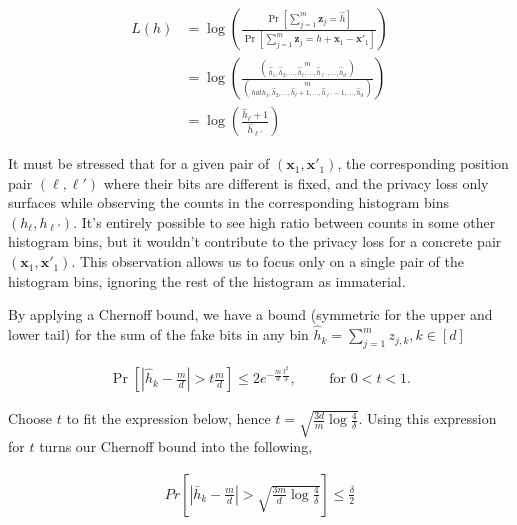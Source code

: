 \documentclass[11pt]{article}
\newcommand{\bbx}{\pmb{x}}
\newcommand{\bbz}{\pmb{z}}
\begin{document}
\begin{align*}
 L(h) &= \log \left ( \frac{\Pr[\sum^m_{j=1} \bbz_j = \hat{h} ]}{\Pr[ \sum^m_{j=1} \bbz_j = \hat{h} + \bbx_1 - \bbx'_1]} \right ) \\
 & = \log  \left ( \frac{ {m \choose \hat{h}_1, \hat{h}_2, \dots , \hat{h}_\ell, \dots, \hat{h}_{\ell'}, \dots, \hat{h}_d}}{ { m \choose hat{h}_1, \hat{h}_2, \dots , \hat{h}_\ell + 1, \dots, \hat{h}_{\ell'} - 1, \dots, \hat{h}_d}} \right ) \\
 & = \log  \left ( \frac{\hat{h}_\ell + 1}{\hat{h}_{\ell'}} \right ) 
\end{align*}

It must be stressed that for a given pair of $(\bbx_1, \bbx'_1)$, the corresponding position pair $(\ell,\ell')$ where their bits are different is fixed, and the privacy loss only surfaces while observing the counts in the corresponding histogram bins $(h_\ell, h_{\ell'})$.  It's entirely possible to see high ratio between counts in some other histogram bins, but it wouldn't contribute to the privacy loss for a concrete pair $(\bbx_1, \bbx'_1)$.  This observation allows us to focus only on a single pair of the histogram bins, ignoring the rest of the histogram as immaterial.  

By applying a Chernoff bound, we have a bound (symmetric for the upper and lower tail) for the sum of the fake bits in any bin $\hat{h}_k = \sum^m_{j=1} z_{j,k},  k \in [d]$

\begin{align*}
 \Pr \left [ \left | \hat{h}_k - \frac{m}{d} \right | > t \frac{m}{d} \right ]  \le 2 e^{- \frac{m}{d} \frac{t^2}{3}}, \qquad \text{ for  } 0 < t < 1.
\end{align*}

Choose $t$ to fit the expression below, hence $t = \sqrt{  \frac{3d}{m} \log{\frac{4}{\delta}} }$.
Using this expression for $t$ turns our Chernoff bound into the following,
 
 \begin{align}
 Pr \left [ \left | \bar{h}_k - \frac{m}{d} \right | >  \sqrt{  \frac{3m}{d} \log{\frac{4}{\delta}} } \right ]  \le \frac{\delta}{2}
\end{align}
\end{document}
